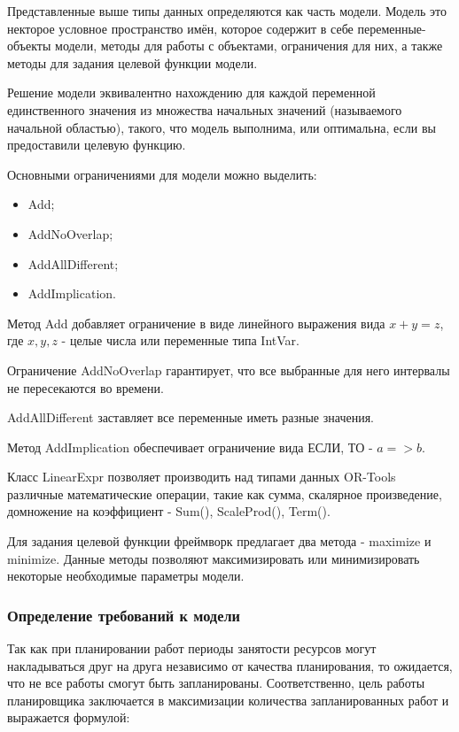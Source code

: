 Представленные выше типы данных определяются как часть модели. Модель это некторое условное пространство имён, которое содержит в себе переменные-объекты модели, методы для работы с объектами, ограничения для них, а также методы для задания целевой функции модели.

Решение модели эквивалентно нахождению для каждой переменной единственного значения из множества начальных значений (называемого начальной областью), такого, что модель выполнима, или оптимальна, если вы предоставили целевую функцию.

Основными ограничениями для модели можно выделить:
\begin{itemize}
	\item Add; 
	\item AddNoOverlap;
	\item AddAllDifferent;
	\item AddImplication.
\end{itemize}

Метод Add добавляет ограничение в виде линейного выражения вида $x + y = z$, где $x, y, z$ - целые числа или переменные типа IntVar.

Ограничение AddNoOverlap гарантирует, что все выбранные для него интервалы не пересекаются во времени.

AddAllDifferent заставляет все переменные иметь разные значения.

Метод AddImplication обеспечивает ограничение вида ЕСЛИ, ТО - $a => b$.

Класс LinearExpr позволяет производить над типами данных OR-Tools различные математические операции, такие как сумма, скалярное произведение, домножение на коэффициент - Sum(), ScaleProd(), Term().

Для задания целевой функции фреймворк предлагает два метода - maximize и minimize. Данные методы позволяют максимизировать или минимизировать некоторые необходимые параметры модели.


\subsubsection{Определение требований к модели}

Так как при планировании работ периоды занятости ресурсов могут накладываться друг на друга независимо от качества планирования, то ожидается, что не все работы смогут быть запланированы. Соответственно, цель работы планировщика заключается в максимизации количества запланированных работ и выражается формулой:

